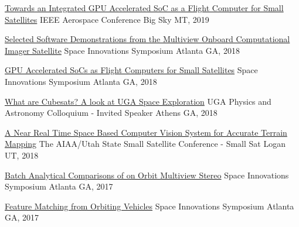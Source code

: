 \documentclass[10pt,a4paper]{article}
\begin{document}
\headedsection
  {{\color{bluegreen} \faTelevision} \href{http://smallsat.uga.edu/images/documents/presentations/IEEE_Aerospace_GPU_Presentation.pdf}{Towards an Integrated GPU Accelerated SoC as a Flight Computer for Small Satellites}}{%
  \headedsubsection
    {IEEE Aerospace Conference}
    {Big Sky MT, 2019}
    {}
}

\headedsection
  {{\color{bluegreen} \faTelevision} \href{http://smallsat.uga.edu/images/documents/presentations/MOCI_Software_Demo2018.pdf}{Selected Software Demonstrations from the Multiview Onboard Computational Imager Satellite}}{%
  \headedsubsection
    {Space Innovations Symposium}
    {Atlanta GA, 2018}
    {}
}

\headedsection
  {{\color{bluegreen} \faMapO} \href{http://smallsat.uga.edu/images/documents/posters/GPU_SmallSatposter.pdf}{GPU Accelerated SoCs as Flight Computers for Small Satellites}}{%
  \headedsubsection
    {Space Innovations Symposium}
    {Atlanta GA, 2018}
    {}
}

\headedsection
  {{\color{bluegreen} \faTelevision} \href{http://smallsat.uga.edu/}{What are Cubesats? A look at UGA Space Exploration}}{%
  \headedsubsection
    {UGA Physics and Astronomy Colloquium - Invited Speaker}
    {Athens GA, 2018}
    {}
}

\headedsection
  {{\color{bluegreen} \faStickyNoteO} \href{http://smallsat.uga.edu/images/documents/papers/Adams_32nd_SmallSatConference.pdf}{A Near Real Time Space Based Computer Vision System for Accurate Terrain Mapping}}{%
  \headedsubsection
    {The AIAA/Utah State Small Satellite Conference - Small Sat}
    {Logan UT, 2018}
    {}
}

\headedsection
  {{\color{bluegreen} \faTelevision} \href{http://smallsat.uga.edu/images/documents/presentations/Adams,Caleb_Presentation.pdf}{Batch Analytical Comparisons of on Orbit Multiview Stereo}}{%
  \headedsubsection
    {Space Innovations Symposium}
    {Atlanta GA, 2017}
    {}
}

\headedsection
  {{\color{bluegreen} \faMapO} \href{http://smallsat.uga.edu/images/documents/posters/Feature_Matching_from_Orbiting_Vehicles.pdf}{Feature Matching from Orbiting Vehicles}}{%
  \headedsubsection
    {Space Innovations Symposium}
    {Atlanta GA, 2017}
    {}
}
\end{document}

